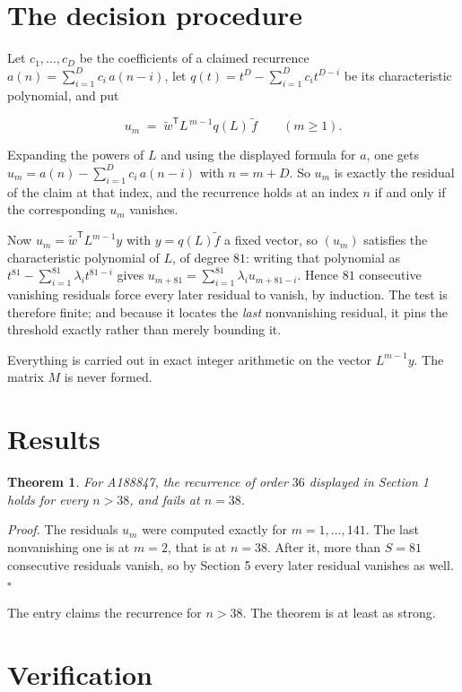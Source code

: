 \documentclass[11pt]{article}
\newtheorem{theorem}{Theorem}
\theoremstyle{definition}
\begin{document}
\section{The decision procedure}

Let $c_1,\dots,c_D$ be the coefficients of a claimed recurrence $a(n) = \sum_{i=1}^{D} c_i\,a(n-i)$, let $q(t) = t^{D} - \sum_{i=1}^{D} c_i t^{D-i}$ be its characteristic polynomial, and put

\[u_m \;=\; \tilde w^{\mathsf T} L^{\,m-1} q(L)\,\tilde f \qquad (m \ge 1).\]

Expanding the powers of $L$ and using the displayed formula for $a$, one gets $u_m = a(n) - \sum_{i=1}^{D} c_i\,a(n-i)$ with $n = m + D$. So $u_m$ is exactly the residual of the claim at that index, and the recurrence holds at an index $n$ if and only if the corresponding $u_m$ vanishes.

Now $u_m = \tilde w^{\mathsf T} L^{m-1} y$ with $y = q(L)\tilde f$ a fixed vector, so $(u_m)$ satisfies the characteristic polynomial of $L$, of degree $81$: writing that polynomial as $t^{81} - \sum_{i=1}^{81} \lambda_i t^{81-i}$ gives $u_{m+81} = \sum_{i=1}^{81} \lambda_i u_{m+81-i}$. Hence $81$ consecutive vanishing residuals force every later residual to vanish, by induction. The test is therefore finite; and because it locates the {\itshape last} nonvanishing residual, it pins the threshold exactly rather than merely bounding it.

Everything is carried out in exact integer arithmetic on the vector $L^{m-1}y$. The matrix $M$ is never formed.

\section{Results}

\begin{theorem} For A188847, the recurrence of order $36$ displayed in Section 1 holds for every $n > 38$, and fails at $n = 38$.\end{theorem}

{\itshape Proof.} The residuals $u_m$ were computed exactly for $m = 1,\dots,141$. The last nonvanishing one is at $m = 2$, that is at $n = 38$. After it, more than $S = 81$ consecutive residuals vanish, so by Section 5 every later residual vanishes as well. $\square$

The entry claims the recurrence for $n > 38$. The theorem is at least as strong.

\section{Verification}
\end{document}
